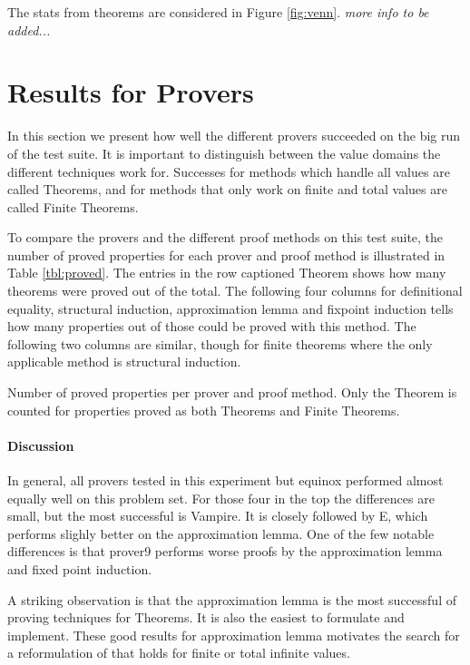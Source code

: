 The stats from theorems are considered in Figure
\ref{fig:venn}. \emph{more info to be added...}


\section{Results for Provers}

In this section we present how well the different provers succeeded on
the big run of the test suite. It is important to distinguish between
the value domains the different techniques work for. Successes for
methods which handle all values are called Theorems, and for methods
that only work on finite and total values are called Finite Theorems.

To compare the provers and the different proof methods on this test
suite, the number of proved properties for each prover and proof
method is illustrated in Table \ref{tbl:proved}. The entries in the
row captioned Theorem shows how many theorems were proved out of the
total. The following four columns for definitional equality,
structural induction, approximation lemma and fixpoint induction tells
how many properties out of those could be proved with this method. The
following two columns are similar, though for finite theorems where the
only applicable method is structural induction.

\begin{table}[h]
\centering

\caption{Number of proved properties per prover and proof method.
         Only the Theorem is counted for properties proved as both
         Theorems and Finite Theorems.
\label{tbl:proved}
}
\end{table}



\paragraph{Discussion}

In general, all provers tested in this experiment but equinox
performed almost equally well on this problem set. For those four in
the top the differences are small, but the most successful is
Vampire. It is closely followed by E, which performs slighly better on
the approximation lemma. One of the few notable differences is that
prover9 performs worse proofs by the approximation lemma and fixed
point induction.

A striking observation is that the approximation lemma is the most
successful of proving techniques for Theorems. It is also the easiest
to formulate and implement. These good results for approximation
lemma motivates the search for a reformulation of that holds for
finite or total infinite values.

